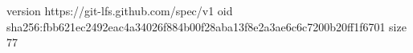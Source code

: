 version https://git-lfs.github.com/spec/v1
oid sha256:fbb621ec2492eac4a34026f884b00f28aba13f8e2a3ae6c6c7200b20ff1f6701
size 77
